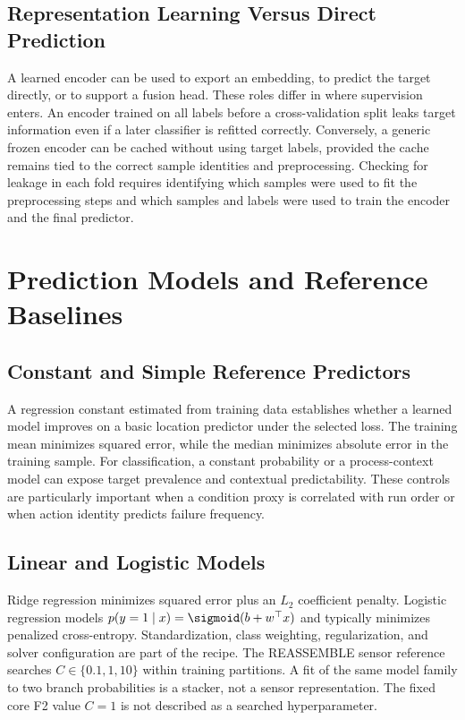 \subsection{Representation Learning Versus Direct Prediction}
A learned encoder can be used to export an embedding, to predict the target directly, or to support a fusion head. These roles differ in where supervision enters. An encoder trained on all labels before a cross-validation split leaks target information even if a later classifier is refitted correctly. Conversely, a generic frozen encoder can be cached without using target labels, provided the cache remains tied to the correct sample identities and preprocessing. Checking for leakage in each fold requires identifying which samples were used to fit the preprocessing steps and which samples and labels were used to train the encoder and the final predictor.

\section{Prediction Models and Reference Baselines}
\subsection{Constant and Simple Reference Predictors}
A regression constant estimated from training data establishes whether a learned model improves on a basic location predictor under the selected loss. The training mean minimizes squared error, while the median minimizes absolute error in the training sample. For classification, a constant probability or a process-context model can expose target prevalence and contextual predictability. These controls are particularly important when a condition proxy is correlated with run order or when action identity predicts failure frequency.

\subsection{Linear and Logistic Models}
Ridge regression minimizes squared error plus an $L_2$ coefficient penalty. Logistic regression models $p(y=1\mid x)=\sigmoid(b+w^\top x)$ and typically minimizes penalized cross-entropy. Standardization, class weighting, regularization, and solver configuration are part of the recipe. The REASSEMBLE sensor reference searches $C\in\{0.1,1,10\}$ within training partitions. A fit of the same model family to two branch probabilities is a stacker, not a sensor representation. The fixed core F2 value $C=1$ is not described as a searched hyperparameter.

